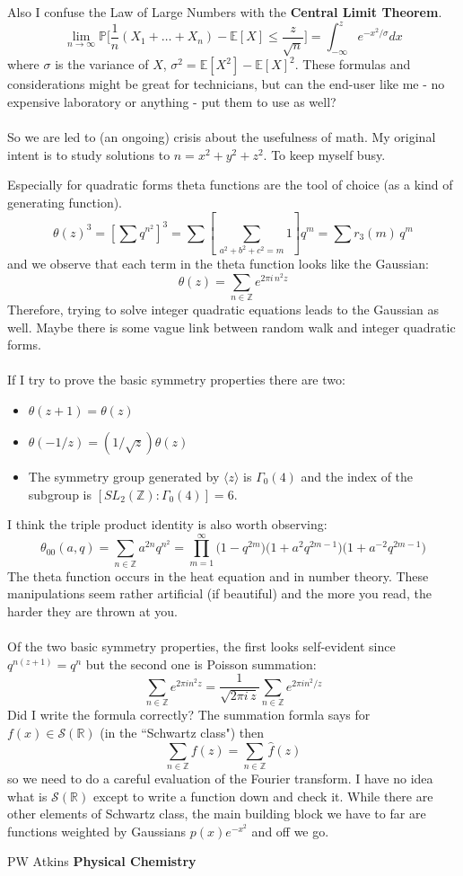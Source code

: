 \documentclass[12pt]{article}
\begin{document}
Also I confuse the Law of Large Numbers with the \textbf{Central Limit Theorem}.
$$ \lim_{n \to \infty} \mathbb{P} \Big[  \frac{1}{n}(X_1 + \dots + X_n) - \mathbb{E}[X]  \leq \frac{z}{\sqrt{n}} \Big] = \int_{-\infty}^z e^{-x^2/\sigma} dx $$
where $\sigma$ is the variance of $X$, $\sigma^2 = \mathbb{E}[X^2] - \mathbb{E}[X]^2$. These formulas and considerations might be great for technicians, but can the end-user like me - no expensive laboratory or anything - put them to use as well? \\ \\
So we are led to (an ongoing) crisis about the usefulness of math.  My original intent is to study solutions to $n = x^2 + y^2 + z^2$.  To keep myself busy.

\newpage

\noindent Especially for quadratic forms theta functions are the tool of choice (as a kind of generating function).
$$ \theta(z)^3 = \left[ \sum q^{n^2} \right]^3 = \sum \left[\, \sum_{a^2 + b^2 + c^2 = m} 1 \right] q^m 
= \sum r_3(m) \, q^m $$
and we observe that each term in the theta function looks like the Gaussian:
$$ \theta(z) = \sum_{n \in \mathbb{Z}} e^{2\pi i \, n^2 z} $$
Therefore, trying to solve integer quadratic equations leads to the Gaussian as well.  Maybe there is some vague link between random walk and integer quadratic forms.  \\ \\
If I try to prove the basic symmetry properties there are two:
\begin{itemize}
\item $\theta(z+1) = \theta(z)$
\item $\theta(-1/z) =  (1/\sqrt{z}) \theta(z)$
\item The symmetry group generated by $\langle z  \rangle $ is $\Gamma_0(4)$ and the index of the subgroup is $[SL_2(\mathbb{Z}):\Gamma_0(4) ] = 6$.
\end{itemize}
I think the triple product identity is also worth observing:
$$ \theta_{00}(a, q) = \sum_{n \in \mathbb{Z}} a^{2n} q^{n^2} = 
\prod_{m=1}^\infty \big( 1 - q^{2m} \big) \big( 1 + a^2 q^{2m-1} \big) \big( 1 + a^{-2} q^{2m-1} \big)$$
The theta function occurs in the heat equation and in number theory.  These manipulations seem rather artificial (if beautiful) and the more you read, the harder they are thrown at you.  \\ \\
Of the two basic symmetry properties, the first looks self-evident since $q^{n(z+1)} = q^{n}$ but the second one is Poisson summation:
$$ \sum_{n \in \mathbb{Z}} e^{2\pi i n^2 z} = \frac{1}{\sqrt{2\pi i \, z}}\sum_{n \in \mathbb{Z}} e^{2\pi i n^2 /z} $$
Did I write the formula correctly?  The summation formla says for $f(x) \in \mathcal{S}(\mathbb{R})$ (in the ``Schwartz class") then
$$ \sum_{n \in \mathbb{Z}} f(z) = \sum_{n \in \mathbb{Z}} \widehat{f}(z) $$
so we need to do a careful evaluation of the Fourier transform. I have no idea what is $\mathcal{S}(\mathbb{R})$ except to write a function down and check it.  While there are other elements of Schwartz class, the main building block we have to far are functions weighted by Gaussians $p(x) e^{-x^2}$ and off we go.
\vfill

\begin{thebibliography}{}

\item PW Atkins \textbf{Physical Chemistry}

\end{thebibliography}
\end{document}
